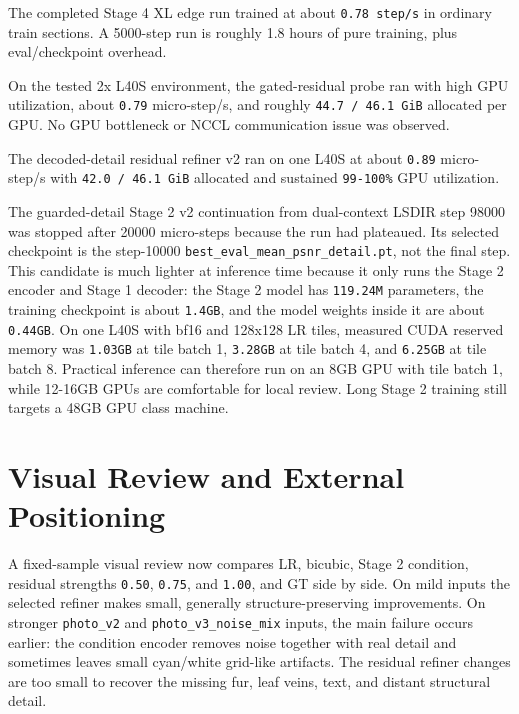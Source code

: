 \documentclass[
  10pt,
]{article}
\begin{document}
The completed Stage 4 XL edge run trained at about \texttt{0.78\ step/s}
in ordinary train sections. A 5000-step run is roughly 1.8 hours of pure
training, plus eval/checkpoint overhead.

On the tested 2x L40S environment, the gated-residual probe ran with
high GPU utilization, about \texttt{0.79} micro-step/s, and roughly
\texttt{44.7\ /\ 46.1\ GiB} allocated per GPU. No GPU bottleneck or NCCL
communication issue was observed.

The decoded-detail residual refiner v2 ran on one L40S at about
\texttt{0.89} micro-step/s with \texttt{42.0\ /\ 46.1\ GiB} allocated
and sustained \texttt{99-100\%} GPU utilization.

The guarded-detail Stage 2 v2 continuation from dual-context LSDIR step
98000 was stopped after 20000 micro-steps because the run had plateaued.
Its selected checkpoint is the step-10000
\texttt{best\_eval\_mean\_psnr\_detail.pt}, not the final step. This
candidate is much lighter at inference time because it only runs the
Stage 2 encoder and Stage 1 decoder: the Stage 2 model has
\texttt{119.24M} parameters, the training checkpoint is about
\texttt{1.4GB}, and the model weights inside it are about
\texttt{0.44GB}. On one L40S with bf16 and 128x128 LR tiles, measured
CUDA reserved memory was \texttt{1.03GB} at tile batch 1,
\texttt{3.28GB} at tile batch 4, and \texttt{6.25GB} at tile batch 8.
Practical inference can therefore run on an 8GB GPU with tile batch 1,
while 12-16GB GPUs are comfortable for local review. Long Stage 2
training still targets a 48GB GPU class machine.

\hypertarget{visual-review-and-external-positioning}{%
\section{Visual Review and External
Positioning}\label{visual-review-and-external-positioning}}

A fixed-sample visual review now compares LR, bicubic, Stage 2
condition, residual strengths \texttt{0.50}, \texttt{0.75}, and
\texttt{1.00}, and GT side by side. On mild inputs the selected refiner
makes small, generally structure-preserving improvements. On stronger
\texttt{photo\_v2} and \texttt{photo\_v3\_noise\_mix} inputs, the main
failure occurs earlier: the condition encoder removes noise together
with real detail and sometimes leaves small cyan/white grid-like
artifacts. The residual refiner changes are too small to recover the
missing fur, leaf veins, text, and distant structural detail.
\end{document}
